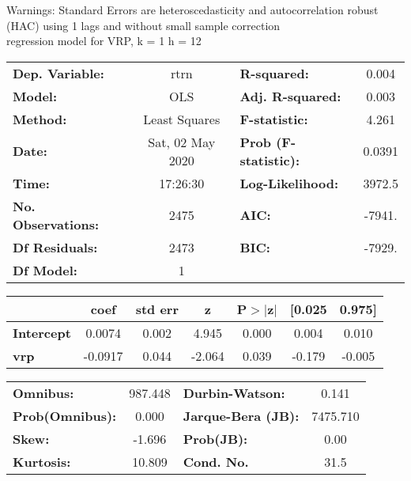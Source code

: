 Warnings: \newline
 [1] Standard Errors are heteroscedasticity and autocorrelation robust (HAC) using 1 lags and without small sample correction\\ 

regression model for VRP, k = 1 h = 12\begin{center}
\begin{tabular}{lclc}
\toprule
\textbf{Dep. Variable:}    &       rtrn       & \textbf{  R-squared:         } &     0.004   \\
\textbf{Model:}            &       OLS        & \textbf{  Adj. R-squared:    } &     0.003   \\
\textbf{Method:}           &  Least Squares   & \textbf{  F-statistic:       } &     4.261   \\
\textbf{Date:}             & Sat, 02 May 2020 & \textbf{  Prob (F-statistic):} &   0.0391    \\
\textbf{Time:}             &     17:26:30     & \textbf{  Log-Likelihood:    } &    3972.5   \\
\textbf{No. Observations:} &        2475      & \textbf{  AIC:               } &    -7941.   \\
\textbf{Df Residuals:}     &        2473      & \textbf{  BIC:               } &    -7929.   \\
\textbf{Df Model:}         &           1      & \textbf{                     } &             \\
\bottomrule
\end{tabular}
\begin{tabular}{lcccccc}
                   & \textbf{coef} & \textbf{std err} & \textbf{z} & \textbf{P$> |$z$|$} & \textbf{[0.025} & \textbf{0.975]}  \\
\midrule
\textbf{Intercept} &       0.0074  &        0.002     &     4.945  &         0.000        &        0.004    &        0.010     \\
\textbf{vrp}       &      -0.0917  &        0.044     &    -2.064  &         0.039        &       -0.179    &       -0.005     \\
\bottomrule
\end{tabular}
\begin{tabular}{lclc}
\textbf{Omnibus:}       & 987.448 & \textbf{  Durbin-Watson:     } &    0.141  \\
\textbf{Prob(Omnibus):} &   0.000 & \textbf{  Jarque-Bera (JB):  } & 7475.710  \\
\textbf{Skew:}          &  -1.696 & \textbf{  Prob(JB):          } &     0.00  \\
\textbf{Kurtosis:}      &  10.809 & \textbf{  Cond. No.          } &     31.5  \\
\bottomrule
\end{tabular}
\end{center}

